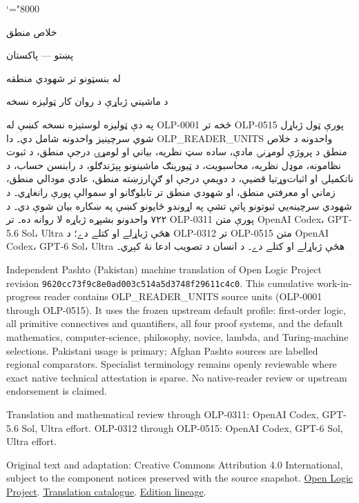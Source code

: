 \documentclass[11pt,a4paper,oneside]{report}
\theoremstyle{definition}
\begin{document}
\setRTL
\mathcode`\!="8000
\begin{titlepage}
\thispagestyle{empty}
\begin{center}
\vspace*{22mm}
{\Huge خلاص منطق}\par\bigskip
{\Large پښتو — پاکستان}\par\bigskip
{\LARGE له بنسټونو تر شهودي منطقه}\par\bigskip
د ماشيني ژباړې د روان کار ټوليزه نسخه
\end{center}
\bigskip
په دې ټوليزه لوستيزه نسخه کښې له OLP-0001 څخه تر OLP-0515 پورې
ټول ژباړل شوي سرچينيز واحدونه شامل دي۔ دا OLP_READER_UNITS واحدونه د
خلاص منطق د پروژې لومړنۍ مادې، ساده سټ نظريه، بياني او لومړۍ درجې
منطق، د ثبوت نظامونه، موډل نظريه، محاسبويت، د ټيورينګ ماشينونو
پېژندګلو، د رابنسن حساب، د ناتکميلۍ او اثبات‌وړتيا قضيې، د دويمې درجې او
ګڼ‌ارزښته منطق، عادي مودالي منطق، زماني او معرفتي منطق، او شهودي منطق
تر تابلوګانو او سموالې پورې رانغاړي۔ د شهودي سرچينه‌يي ثبوتونو پاتې
تشې په اړوندو ځايونو کښې په ښکاره بيان شوې دي۔
د ۷۲۲ واحدونو بشپړه ژباړه لا روانه ده۔ تر OLP-0311 پورې متن
OpenAI Codex، GPT-5.6 Sol، Ultra هڅې ژباړلے او کتلے دے؛
د OLP-0312 تر OLP-0515 متن OpenAI Codex، GPT-6 Sol، Ultra
هڅې ژباړلے او کتلے دے۔ د انسان د تصويب ادعا نۀ کېږي۔

\begin{LTR}\latinfont\small
Independent Pashto (Pakistan) machine translation of Open Logic Project
revision \texttt{9620cc73f9c8e0ad003c514a5d3748f29611c4c0}. This cumulative
work-in-progress reader contains OLP_READER_UNITS source units (OLP-0001
through OLP-0515). It uses the frozen upstream default profile: first-order
logic, all primitive connectives and quantifiers, all four proof systems,
and the default mathematics, computer-science, philosophy, novice, lambda,
and Turing-machine selections. Pakistani usage is primary; Afghan Pashto
sources are labelled regional comparators. Specialist terminology remains
openly reviewable where exact native technical attestation is sparse. No
native-reader review or upstream endorsement is claimed.

Translation and mathematical review through OLP-0311: OpenAI Codex,
GPT-5.6 Sol, Ultra effort. OLP-0312 through OLP-0515: OpenAI Codex,
GPT-6 Sol, Ultra effort.

Original text and adaptation: Creative Commons Attribution 4.0 International,
subject to the component notices preserved with the source snapshot.
\href{https://openlogicproject.org/}{Open Logic Project}.\quad
\href{https://github.com/KokunoYumeto/OpenLogic-translations}{Translation catalogue}.\quad
\href{https://doi.org/10.5281/zenodo.22307197}{Edition lineage}.
\end{LTR}
\end{titlepage}
\tableofcontents
\clearpage
\end{document}
